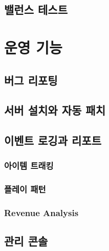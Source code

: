 \documentclass[chapter,kosection, 10.5pt, romanfixed, a4paper]{oblivoir}
\begin{document}
\subsection{밸런스 테스트}


\section{운영 기능}

\subsection{버그 리포팅}

\subsection{서버 설치와 자동 패치}

\subsection{이벤트 로깅과 리포트}

\subsubsection{아이템 트래킹}

\subsubsection{플레이 패턴}

\subsubsection{Revenue Analysis}

\subsection{관리 콘솔}
\end{document}
